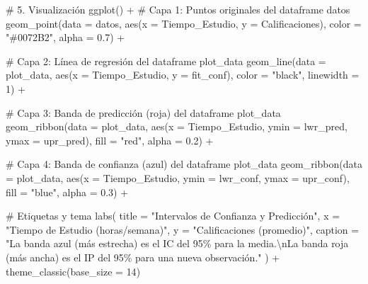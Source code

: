 \documentclass[
  letterpaper,
  DIV=11,
  numbers=noendperiod]{scrreprt}
\newenvironment{Shaded}{\begin{snugshade}}{\end{snugshade}}
\newcommand{\AttributeTok}[1]{\textcolor[rgb]{0.40,0.45,0.13}{#1}}
\newcommand{\CommentTok}[1]{\textcolor[rgb]{0.37,0.37,0.37}{#1}}
\newcommand{\DecValTok}[1]{\textcolor[rgb]{0.68,0.00,0.00}{#1}}
\newcommand{\FloatTok}[1]{\textcolor[rgb]{0.68,0.00,0.00}{#1}}
\newcommand{\FunctionTok}[1]{\textcolor[rgb]{0.28,0.35,0.67}{#1}}
\newcommand{\NormalTok}[1]{\textcolor[rgb]{0.00,0.23,0.31}{#1}}
\newcommand{\SpecialCharTok}[1]{\textcolor[rgb]{0.37,0.37,0.37}{#1}}
\newcommand{\StringTok}[1]{\textcolor[rgb]{0.13,0.47,0.30}{#1}}
\begin{document}
\begin{tcolorbox}
\begin{Shaded}
\begin{Highlighting}[]
\CommentTok{\# 5. Visualización}
\FunctionTok{ggplot}\NormalTok{() }\SpecialCharTok{+}
  \CommentTok{\# Capa 1: Puntos originales del dataframe \textquotesingle{}datos\textquotesingle{}}
  \FunctionTok{geom\_point}\NormalTok{(}\AttributeTok{data =}\NormalTok{ datos, }\FunctionTok{aes}\NormalTok{(}\AttributeTok{x =}\NormalTok{ Tiempo\_Estudio, }\AttributeTok{y =}\NormalTok{ Calificaciones), }\AttributeTok{color =} \StringTok{"\#0072B2"}\NormalTok{, }\AttributeTok{alpha =} \FloatTok{0.7}\NormalTok{) }\SpecialCharTok{+}
  
  \CommentTok{\# Capa 2: Línea de regresión del dataframe \textquotesingle{}plot\_data\textquotesingle{}}
  \FunctionTok{geom\_line}\NormalTok{(}\AttributeTok{data =}\NormalTok{ plot\_data, }\FunctionTok{aes}\NormalTok{(}\AttributeTok{x =}\NormalTok{ Tiempo\_Estudio, }\AttributeTok{y =}\NormalTok{ fit\_conf), }\AttributeTok{color =} \StringTok{"black"}\NormalTok{, }\AttributeTok{linewidth =} \DecValTok{1}\NormalTok{) }\SpecialCharTok{+}
  
  \CommentTok{\# Capa 3: Banda de predicción (roja) del dataframe \textquotesingle{}plot\_data\textquotesingle{}}
  \FunctionTok{geom\_ribbon}\NormalTok{(}\AttributeTok{data =}\NormalTok{ plot\_data, }\FunctionTok{aes}\NormalTok{(}\AttributeTok{x =}\NormalTok{ Tiempo\_Estudio, }\AttributeTok{ymin =}\NormalTok{ lwr\_pred, }\AttributeTok{ymax =}\NormalTok{ upr\_pred), }\AttributeTok{fill =} \StringTok{"red"}\NormalTok{, }\AttributeTok{alpha =} \FloatTok{0.2}\NormalTok{) }\SpecialCharTok{+}
  
  \CommentTok{\# Capa 4: Banda de confianza (azul) del dataframe \textquotesingle{}plot\_data\textquotesingle{}}
  \FunctionTok{geom\_ribbon}\NormalTok{(}\AttributeTok{data =}\NormalTok{ plot\_data, }\FunctionTok{aes}\NormalTok{(}\AttributeTok{x =}\NormalTok{ Tiempo\_Estudio, }\AttributeTok{ymin =}\NormalTok{ lwr\_conf, }\AttributeTok{ymax =}\NormalTok{ upr\_conf), }\AttributeTok{fill =} \StringTok{"blue"}\NormalTok{, }\AttributeTok{alpha =} \FloatTok{0.3}\NormalTok{) }\SpecialCharTok{+}
  
  \CommentTok{\# Etiquetas y tema}
  \FunctionTok{labs}\NormalTok{(}
    \AttributeTok{title =} \StringTok{"Intervalos de Confianza y Predicción"}\NormalTok{,}
    \AttributeTok{x =} \StringTok{"Tiempo de Estudio (horas/semana)"}\NormalTok{,}
    \AttributeTok{y =} \StringTok{"Calificaciones (promedio)"}\NormalTok{,}
    \AttributeTok{caption =} \StringTok{"La banda azul (más estrecha) es el IC del 95\% para la media.}\SpecialCharTok{\textbackslash{}n}\StringTok{La banda roja (más ancha) es el IP del 95\% para una nueva observación."}
\NormalTok{  ) }\SpecialCharTok{+}
  \FunctionTok{theme\_classic}\NormalTok{(}\AttributeTok{base\_size =} \DecValTok{14}\NormalTok{)}
\end{Highlighting}
\end{Shaded}


\end{tcolorbox}
\end{document}
